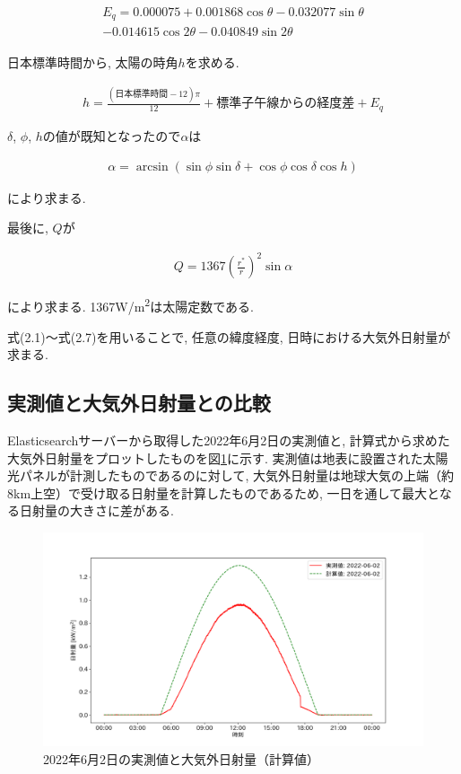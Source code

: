 \begin{eqnarray}
  \begin{split}
    E_q =  0.000075+0.001868\cos \theta-0.032077\sin \theta\\
    -0.014615\cos 2\theta-0.040849\sin 2\theta
  \end{split}
\end{eqnarray}

日本標準時間から, 太陽の時角$h$を求める.

\begin{eqnarray}
  h = \frac{(日本標準時間-12)\pi}{12}+標準子午線からの経度差+E_q
\end{eqnarray}

$\delta$, $\phi$, $h$の値が既知となったので$\alpha$は

\begin{eqnarray}
  \alpha = \arcsin (\sin \phi\sin \delta+\cos \phi\cos \delta\cos h)
\end{eqnarray}

により求まる.

最後に, $Q$が

\begin{eqnarray}
  Q = 1367(\frac{r^{*}}{r})^{2}\sin \alpha
\end{eqnarray}

により求まる. 1367\si{\watt}/\si{\metre\squared}は太陽定数である.

式(2.1)～式(2.7)を用いることで, 任意の緯度経度, 日時における大気外日射量が求まる.


\subsection{実測値と大気外日射量との比較}
Elasticsearchサーバーから取得した2022年6月2日の実測値と, 計算式から求めた大気外日射量をプロットしたものを図\ref{20220529-p1}に示す. 実測値は地表に設置された太陽光パネルが計測したものであるのに対して, 大気外日射量は地球大気の上端（約8km上空）で受け取る日射量を計算したものであるため, 一日を通して最大となる日射量の大きさに差がある.

\begin{figure}[H]
  \begin{center}
    \includegraphics[width=160mm]{sotu/figure/2/original-20220602-corr.png}
    \caption{2022年6月2日の実測値と大気外日射量（計算値）}
    \label{20220529-p1}
  \end{center}
\end{figure}

